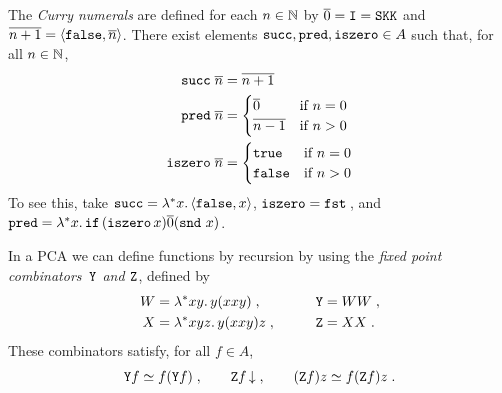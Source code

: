 The
%
%
%
\label{sym:curry_numeral}%
%
\emph{Curry numerals} are defined for each $n \in \mathbb{N}$ by
$\overline{0} = \mathtt{I} = \mathtt{S} \mathtt{K} \mathtt{K}$ and $\overline{n+1} =
\langle \mathtt{false}, \overline{n} \rangle$. There exist elements
%
%
%
%
%
$\mathtt{succ}, \mathtt{pred}, \mathtt{iszero} \in A$ such that,
for all $n \in \mathbb{N}$,
%
\label{sym:succ}%
\label{sym:pred}%
\label{sym:iszero}%
%
\begin{align*}
  \mathtt{succ}\; \overline{n} &= \overline{n+1} \\
  \mathtt{pred}\; \overline{n} &= 
  \begin{cases}
    \overline{0} & \text{if $n = 0$} \\
    \overline{n-1} & \text{if $n > 0$}
  \end{cases}\\
  \mathtt{iszero}\; \overline{n} &=
  \begin{cases}
    \mathtt{true} & \text{if $n = 0$} \\
    \mathtt{false} & \text{if $n > 0$}
  \end{cases}
\end{align*}
%
To see this, take $\mathtt{succ} = \lambda^{*} x .\,\langle \mathtt{false}, x \rangle$, 
$\mathtt{iszero} = \mathtt{fst}\,$, and $\mathtt{pred} =
\lambda^{*} x .\,\mathtt{if}\, (\mathtt{iszero}\, x) \overline{0} (\mathtt{snd}\,\, x)$.

In a PCA we can define functions by recursion by using the
%
%
%
%
%
\label{sym:combY}%
\label{sym:combZ}%
\label{sym:combW}%
%
\emph{fixed 
  point combinators~$\mathtt{Y}$ and $\mathtt{Z}$}, defined by
%
\begin{alignat*}{2}
  W &= \lambda^{*} x y .\,y(x x y)\;, &
  \qquad
  \mathtt{Y} &= W W \;, \\
  X &= \lambda^{*} x y z .\,y (x x y) z \;, &
  \qquad
  \mathtt{Z} &= X X \;.
\end{alignat*}
%
These combinators satisfy, for all $f \in A$,
%
\begin{equation*}
  \mathtt{Y} f \simeq f (\mathtt{Y} f) \;,
  \qquad
  \mathtt{Z} f \,{\downarrow} \;,
  \qquad
  (\mathtt{Z} f) z \simeq f (\mathtt{Z} f) z \;.
\end{equation*}

